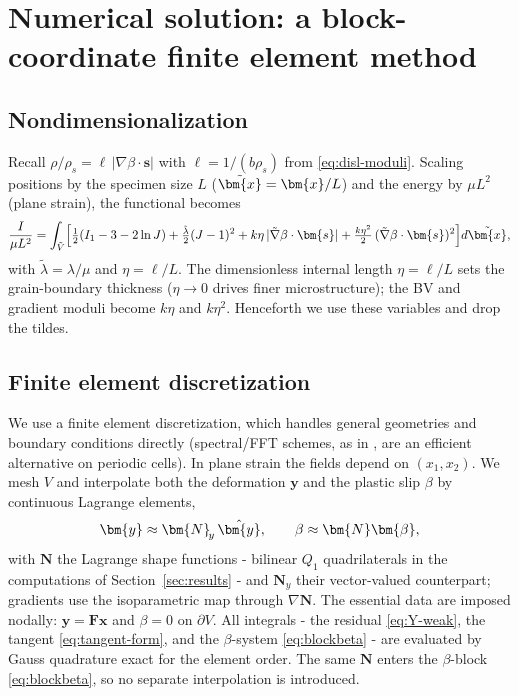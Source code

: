 \documentclass[12pt]{article}
\theoremstyle{plain}
\theoremstyle{definition}
\newcommand{\bF}{\bm{F}}
\newcommand{\bs}{\bm{s}}
\newcommand{\by}{\bm{y}}
\newcommand{\bx}{\bm{x}}
\newcommand{\bN}{\bm{N}}
\newcommand{\bbeta}{\bm{\beta}}
\begin{document}
\section{Numerical solution: a block-coordinate finite element method}\label{sec:method}

\subsection{Nondimensionalization}\label{sec:nondim}
Recall $\rho/\rho_s=\ell\,|\nabla\beta\cdot\bs|$ with $\ell=1/(b\rho_s)$ from
\eqref{eq:disl-moduli}. Scaling positions by the specimen size $L$
($\tilde\bx=\bx/L$) and the energy by $\mu L^{2}$ (plane strain), the
functional becomes
\begin{equation}\label{eq:nondim}
  \frac{I}{\mu L^{2}}=\int_{\tilde V}\Bigl[
  \tfrac12(I_1-3-2\ln J)+\tfrac{\tilde\lambda}{2}(J-1)^{2}
  +k\eta\,|\tilde\nabla\beta\cdot\bs|
  +\tfrac{k\eta^{2}}{2}\,(\tilde\nabla\beta\cdot\bs)^{2}\Bigr]d\tilde\bx,
\end{equation}
with $\tilde\lambda=\lambda/\mu$ and $\eta=\ell/L$.
The dimensionless internal length $\eta=\ell/L$ sets the grain-boundary
thickness ($\eta\to0$ drives finer microstructure); the BV and gradient moduli
become $k\eta$ and $k\eta^{2}$. Henceforth we use these variables and drop the
tildes.

\subsection{Finite element discretization}\label{sec:fem}
We use a finite element discretization, which handles general geometries and
boundary conditions directly (spectral/FFT schemes, as in \citet{moulinec1998numerical},
are an efficient alternative on periodic cells). In plane strain the fields
depend on $(x_1,x_2)$. We mesh $V$ and interpolate both the deformation
$\by$ and the plastic slip $\beta$ by continuous Lagrange elements,
\begin{equation}\label{eq:fe-interp}
  \by\approx\bN_{\!y}\,\hat\by,\qquad \beta\approx\bN\bbeta,
\end{equation}
with $\bN$ the Lagrange shape functions - bilinear $Q_1$ quadrilaterals in the
computations of Section~\ref{sec:results} - and $\bN_{\!y}$ their
vector-valued counterpart; gradients use the isoparametric map through
$\nabla\bN$. The essential data are imposed nodally: $\by=\bF\bx$ and $\beta=0$
on $\partial V$. All integrals - the residual \eqref{eq:Y-weak}, the tangent
\eqref{eq:tangent-form}, and the $\beta$-system \eqref{eq:blockbeta} - are
evaluated by Gauss quadrature exact for the element order. The same $\bN$ enters
the $\beta$-block \eqref{eq:blockbeta}, so no separate interpolation is
introduced.
\end{document}

